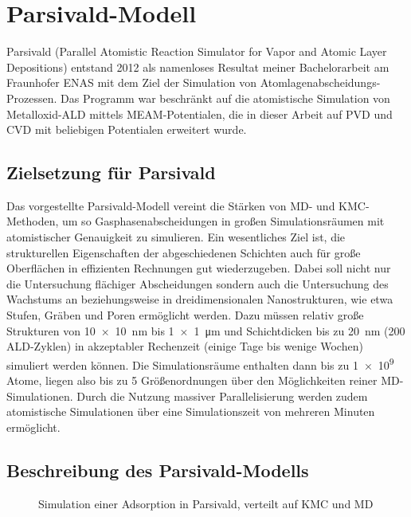 \section{Parsivald-Modell}
\label{parsivald}

Parsivald (Parallel Atomistic Reaction Simulator for Vapor and Atomic Layer Depositions) entstand 2012 als namenloses Resultat meiner Bachelorarbeit\cite{lorenz_entwicklung_2012} am Fraunhofer ENAS mit dem Ziel der Simulation von Atom\-lagen\-abscheidungs-Prozessen.
Das Programm war beschränkt auf die atomistische Simulation von Metall\-oxid-ALD mittels MEAM-Potentialen, die in dieser Arbeit auf PVD und CVD mit beliebigen Potentialen erweitert wurde.

\subsection{Zielsetzung für Parsivald}

Das vorgestellte Parsivald-Modell vereint die Stärken von MD- und KMC-Methoden, um so Gasphasenabscheidungen in großen Simulationsräumen mit atomistischer Genauigkeit zu simulieren.
Ein wesentliches Ziel ist, die strukturellen Eigenschaften der abgeschiedenen Schichten auch für große Oberflächen in effizienten Rechnungen gut wiederzugeben.
Dabei soll nicht nur die Untersuchung flächiger Abscheidungen sondern auch die Untersuchung des Wachstums an beziehungsweise in dreidimensionalen Nanostrukturen, wie etwa Stufen, Gräben und Poren ermöglicht werden.
Dazu müssen relativ große Strukturen von \SI{10x10}{\nano\meter} bis \SI{1x1}{\micro\meter} und Schichtdicken bis zu \SI{20}{\nano\meter} (\num{200} ALD-Zyklen) in akzeptabler Rechenzeit (einige Tage bis wenige Wochen) simuliert werden können.
Die Simulationsräume enthalten dann bis zu \num{1e9} Atome, liegen also bis zu \num{5} Größenordnungen über den Möglichkeiten reiner MD-Simulationen.
Durch die Nutzung massiver Parallelisierung werden zudem atomistische Simulationen über eine Simulationszeit von mehreren Minuten ermöglicht.

\subsection{Beschreibung des Parsivald-Modells}

\begin{figure}[b]
  \centering
  \def\svgwidth{\textwidth}
  
  \caption{Simulation einer Adsorption in Parsivald, verteilt auf KMC und MD}
  \label{fig:parsivald-schema}
\end{figure}

